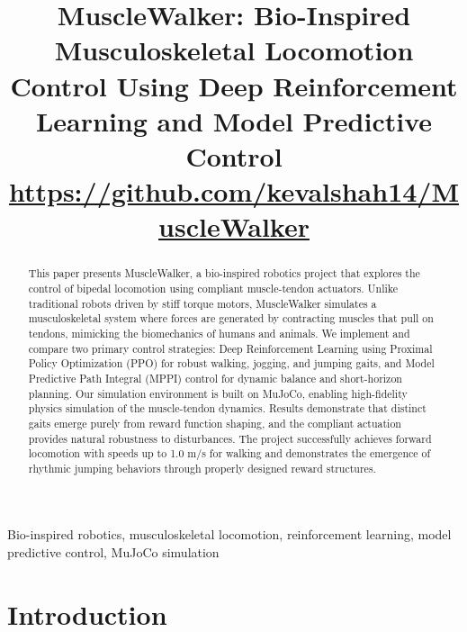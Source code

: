 \documentclass[conference]{IEEEtran}
\begin{document}
\title{MuscleWalker: Bio-Inspired Musculoskeletal Locomotion Control Using Deep Reinforcement Learning and Model Predictive Control\\
{\small \url{https://github.com/kevalshah14/MuscleWalker}}}

\author{
}

\maketitle

\begin{abstract}
This paper presents MuscleWalker, a bio-inspired robotics project that explores the control of bipedal locomotion using compliant muscle-tendon actuators. Unlike traditional robots driven by stiff torque motors, MuscleWalker simulates a musculoskeletal system where forces are generated by contracting muscles that pull on tendons, mimicking the biomechanics of humans and animals. We implement and compare two primary control strategies: Deep Reinforcement Learning using Proximal Policy Optimization (PPO) for robust walking, jogging, and jumping gaits, and Model Predictive Path Integral (MPPI) control for dynamic balance and short-horizon planning. Our simulation environment is built on MuJoCo, enabling high-fidelity physics simulation of the muscle-tendon dynamics. Results demonstrate that distinct gaits emerge purely from reward function shaping, and the compliant actuation provides natural robustness to disturbances. The project successfully achieves forward locomotion with speeds up to 1.0 m/s for walking and demonstrates the emergence of rhythmic jumping behaviors through properly designed reward structures.
\end{abstract}

\begin{IEEEkeywords}
Bio-inspired robotics, musculoskeletal locomotion, reinforcement learning, model predictive control, MuJoCo simulation
\end{IEEEkeywords}

\section{Introduction}
\end{document}
